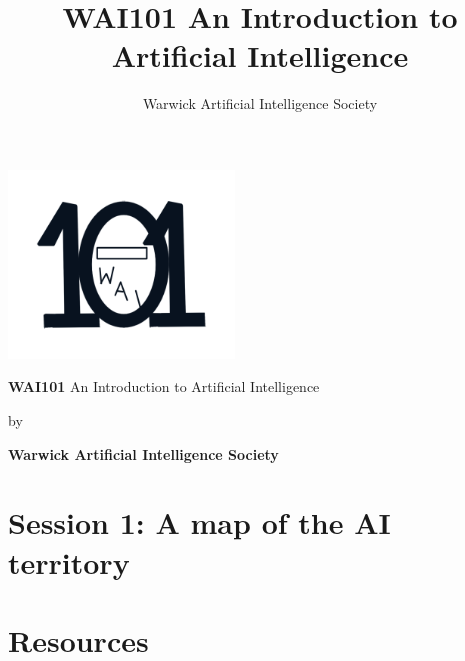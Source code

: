 \documentclass[11pt]{report}
\title{\textbf{WAI101} An Introduction to Artificial Intelligence}
\author{Warwick Artificial Intelligence Society}
\begin{document}
\begin{titlepage}
	\centering
	{\includegraphics[width=6cm]{wai101_logo}\par}
	\vspace{2cm}
	{\huge\textbf{WAI101} An Introduction to Artificial Intelligence\par}
	\vspace{1cm}
	{\Large by \par}
	\vspace{1cm}
	{\Large\bf Warwick Artificial Intelligence Society\par}
	\vfill

\end{titlepage}

\tableofcontents

\chapter{Session 1: A map of the AI territory}

\chapter{Resources}
\end{document}
